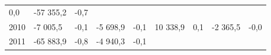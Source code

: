 \begin{longtable}[]{@{}lllllllll@{}}
\begin{minipage}[t]{0.06\columnwidth}
0,0\strut
\end{minipage} & \begin{minipage}[t]{0.09\columnwidth}\raggedright
-57 355,2\strut
\end{minipage} & \begin{minipage}[t]{0.06\columnwidth}\raggedright
-0,7\strut
\end{minipage}\tabularnewline
\begin{minipage}[t]{0.05\columnwidth}\raggedright
2010\strut
\end{minipage} & \begin{minipage}[t]{0.10\columnwidth}\raggedright
-7 005,5\strut
\end{minipage} & \begin{minipage}[t]{0.06\columnwidth}\raggedright
-0,1\strut
\end{minipage} & \begin{minipage}[t]{0.16\columnwidth}\raggedright
-5 698,9\strut
\end{minipage} & \begin{minipage}[t]{0.06\columnwidth}\raggedright
-0,1\strut
\end{minipage} & \begin{minipage}[t]{0.12\columnwidth}\raggedright
10 338,9\strut
\end{minipage} & \begin{minipage}[t]{0.06\columnwidth}\raggedright
0,1\strut
\end{minipage} & \begin{minipage}[t]{0.09\columnwidth}\raggedright
-2 365,5\strut
\end{minipage} & \begin{minipage}[t]{0.06\columnwidth}\raggedright
-0,0\strut
\end{minipage}\tabularnewline
\begin{minipage}[t]{0.05\columnwidth}\raggedright
2011\strut
\end{minipage} & \begin{minipage}[t]{0.10\columnwidth}\raggedright
-65 883,9\strut
\end{minipage} & \begin{minipage}[t]{0.06\columnwidth}\raggedright
-0,8\strut
\end{minipage} & \begin{minipage}[t]{0.16\columnwidth}\raggedright
-4 940,3\strut
\end{minipage} & \begin{minipage}[t]{0.06\columnwidth}\raggedright
-0,1\strut
\end{minipage} & \begin{minipage}[t]{0.12\columnwidth}\raggedright

\end{minipage}
\end{longtable}
